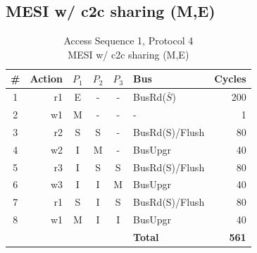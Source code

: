 \documentclass[12pt, letterpaper]{report}
\begin{document}
\subsection{MESI w/ c2c sharing (M,E)}

\begin{table}[H]
	\setlength{\extrarowheight}{.5ex}
	\centering
	\begin{tabular}{ |c|r|c|c|c|l|r| }
		\hline
		\textbf{\#} & \textbf{Action} & \textbf{$P_1$} & \textbf{$P_{2}$} & \textbf{$P_3$} & \textbf{Bus} & \textbf{Cycles} \\
		\hline
		1 & r1 & E & - & - & BusRd($\bar{S}$) & 200 \\
		\hline
		2 & w1 & M & - & - & - & 1 \\
		\hline
		3 & r2 & S & S & - & BusRd(S)/Flush & 80 \\
		\hline
		4 & w2 & I & M & - & BusUpgr & 40 \\
		\hline
		5 & r3 & I & S & S & BusRd(S)/Flush & 80 \\
		\hline
		6 & w3 & I & I & M & BusUpgr & 40 \\
		\hline
		7 & r1 & S & I & S & BusRd(S)/Flush & 80 \\
		\hline
		8 & w1 & M & I & I & BusUpgr & 40 \\
		\hline \hline \hline
		\cellcolor{null} & \cellcolor{null} & \cellcolor{null} & \cellcolor{null} & \cellcolor{null} & \textbf{Total} & \textbf{561} \\
		\hline
	\end{tabular}
	\caption{Access Sequence 1, Protocol 4\\MESI w/ c2c sharing (M,E)}
\end{table}
\end{document}
